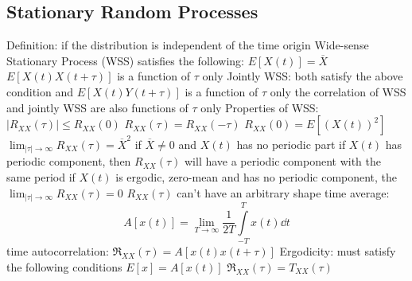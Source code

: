 \documentclass[a4paper,11pt]{article}
\begin{document}
	\subsection{Stationary Random Processes}
	\begin{outline}[enumerate]
		\1 Definition: if the distribution is independent of the time origin
		\1 Wide-sense Stationary Process (WSS) satisfies the following:
			\2 $E \left[ X \left( t \right) \right] = \overline{X}$
			\2 $E \left[ X \left( t \right) X \left( t + \tau \right) \right]$ is a function of $\tau$ only 
		\1 Jointly WSS: both satisfy the above condition and $E\left[X\left(t\right) Y\left(t + \tau \right) \right]$ is a function of $\tau$ only	the correlation of WSS and jointly WSS are also functions of $\tau$ only
		\1 Properties of WSS:
			\2 $\lvert R_{XX}\left( \tau \right) \rvert \leq R_{XX} \left( 0 \right)$
			\2 $R_{XX}\left( \tau \right) = R_{XX}\left( -\tau \right)$
			\2 $R_{XX}\left( 0 \right) = E\left[\left(X\left(t\right)\right)^2\right]$
			\2 $\lim_{\lvert \tau \rvert \to \infty} R_{XX}\left( \tau \right) = \overline{X}^2$ if $\overline{X} \neq 0$ and $X\left(t\right)$ has no periodic part
			\2 if $X\left(t\right)$ has periodic component, then $R_{XX}\left( \tau \right)$ will have a periodic component with the same period
			\2 if $X\left(t\right)$ is ergodic, zero-mean and has no periodic component, the $\lim_{\lvert \tau \rvert \to \infty} R_{XX}\left( \tau \right) = 0$
			\2 $R_{XX}\left( \tau \right)$ can't have an arbitrary shape
		\1 time average:
		\begin{equation}
			A\left[ x\left(t\right) \right] = \lim_{T \to \infty} \frac{1}{2T} \int\limits_{-T}^{T}x\left(t\right) \dd t
		\end{equation}	
		\1 time autocorrelation: $\mathfrak{R}_{XX}\left(\tau\right) = A\left[x\left(t\right) x \left(t + \tau\right) \right]$
		\1 Ergodicity: must satisfy the following conditions
			\2 $E\left[x\right] = A\left[x\left(t\right)\right]$
			\2 $\mathfrak{R}_{XX}\left(\tau\right) = T_{XX}\left(\tau\right)$
	\end{outline}
\end{document}
